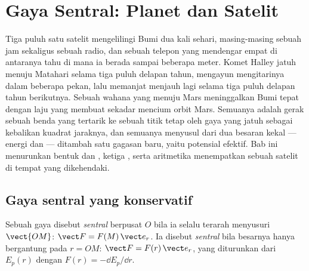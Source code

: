 \chapter{Gaya Sentral: Planet dan Satelit}\label{ch:b1:central-forces}

Tiga puluh satu satelit mengelilingi Bumi dua kali sehari, masing-masing
sebuah jam sekaligus sebuah radio, dan sebuah telepon yang mendengar
empat di antaranya tahu di mana ia berada sampai beberapa meter. Komet
Halley jatuh menuju Matahari selama tiga puluh delapan tahun, mengayun
mengitarinya dalam beberapa pekan, lalu memanjat menjauh lagi selama
tiga puluh delapan tahun berikutnya. Sebuah wahana yang menuju Mars
meninggalkan Bumi tepat dengan laju yang membuat  sekadar
mencium orbit Mars. Semuanya adalah gerak sebuah benda yang tertarik ke
sebuah titik tetap oleh gaya yang jatuh sebagai kebalikan kuadrat
jaraknya, dan semuanya menyusul dari dua besaran kekal --- energi dan
 --- ditambah satu gagasan baru, yaitu potensial efektif.
Bab ini menurunkan bentuk dan , ketiga , serta
aritmetika menempatkan sebuah satelit di tempat yang dikehendaki.

\section{Gaya sentral yang konservatif}

\begin{definition}\label{def:b1:central-forces:central}
Sebuah gaya disebut \emph{sentral} berpusat $O$ bila ia selalu terarah
menyusuri $\vect{OM}$: $\vect F = F(M)\,\vect e_r$. Ia disebut
\emph{sentral } bila besarnya hanya bergantung pada
$r = OM$: $\vect F =
F(r)\,\vect e_r$, yang diturunkan dari  $E_p(r)$ dengan
$F(r) = -\dd E_p/\dd r$.
\end{definition}

